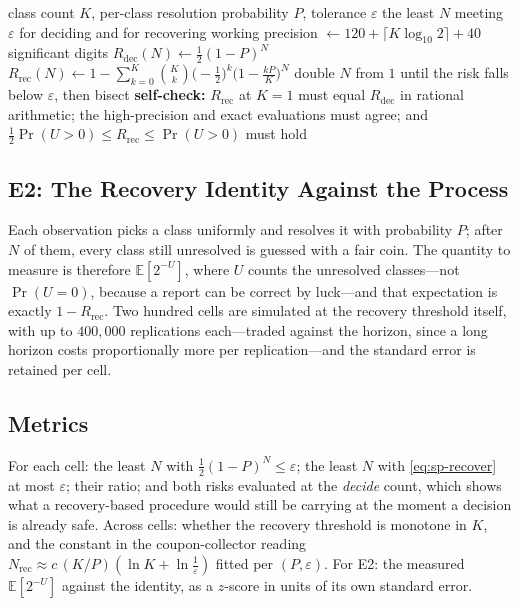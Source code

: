 \documentclass[conference]{IEEEtran}
\theoremstyle{definition}
\begin{document}
\begin{algorithm}[htbp]
\caption{The two thresholds, at a precision set from $K$}
\label{alg:sp-threshold}
\begin{algorithmic}[1]
\REQUIRE class count $K$, per-class resolution probability $P$, tolerance $\varepsilon$
\ENSURE the least $N$ meeting $\varepsilon$ for deciding and for recovering
\STATE working precision $\leftarrow 120+\lceil K\log_{10}2\rceil+40$ significant digits
\STATE $R_{\mathrm{dec}}(N)\leftarrow\tfrac12(1-P)^{N}$ 
\STATE $R_{\mathrm{rec}}(N)\leftarrow1-\sum_{k=0}^{K}\binom{K}{k}\bigl(-\tfrac12\bigr)^{k}
       \bigl(1-\tfrac{kP}{K}\bigr)^{N}$
  \STATE double $N$ from $1$ until the risk falls below $\varepsilon$, then bisect
\ENDFOR
\STATE \textbf{self-check:} $R_{\mathrm{rec}}$ at $K=1$ must equal $R_{\mathrm{dec}}$ in
       rational arithmetic; the high-precision and exact evaluations must agree; and
       $\tfrac12\Pr(U>0)\le R_{\mathrm{rec}}\le\Pr(U>0)$ must hold
\end{algorithmic}
\end{algorithm}

\subsection{E2: The Recovery Identity Against the Process}
\label{sec:sp-e2}

Each observation picks a class uniformly and resolves it with probability $P$; after $N$ of
them, every class still unresolved is guessed with a fair coin. The quantity to measure is
therefore $\mathbb{E}[2^{-U}]$, where $U$ counts the unresolved classes---not
$\Pr(U=0)$, because a report can be correct by luck---and that expectation is exactly
$1-R_{\mathrm{rec}}$. Two hundred cells are simulated at the recovery threshold itself, with up to
$400{,}000$ replications each---traded against the horizon, since a long horizon costs
proportionally more per replication---and the standard error is retained per cell.

\subsection{Metrics}

For each cell: the least $N$ with $\tfrac12(1-P)^{N}\le\varepsilon$; the least $N$ with
\eqref{eq:sp-recover} at most $\varepsilon$; their ratio; and both risks evaluated at the
\emph{decide} count, which shows what a recovery-based procedure would still be carrying at
the moment a decision is already safe. Across cells: whether the recovery threshold is
monotone in $K$, and the constant in the coupon-collector reading
$N_{\mathrm{rec}}\approx c\,(K/P)(\ln K+\ln\tfrac1\varepsilon)$ fitted per $(P,\varepsilon)$.
For E2: the measured $\mathbb{E}[2^{-U}]$ against the identity, as a $z$-score in units of its
own standard error.
\end{document}
